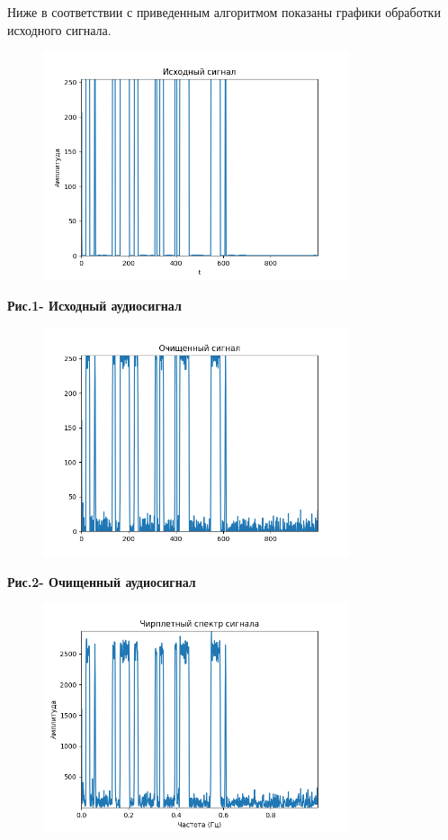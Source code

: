 Ниже в соответствии с приведенным алгоритмом показаны графики обработки
исходного сигнала.


\begin{figure}[H]
	\centering
	\includegraphics[width=0.8\textwidth]{media/ict/image64}
	\caption*{}
\end{figure}


{\bfseries Рис.1- Исходный аудиосигнал}


\begin{figure}[H]
	\centering
	\includegraphics[width=0.8\textwidth]{media/ict/image65}
	\caption*{}
\end{figure}


{\bfseries Рис.2- Очищенный аудиосигнал}


\begin{figure}[H]
	\centering
	\includegraphics[width=0.8\textwidth]{media/ict/image66}
	\caption*{}
\end{figure}


